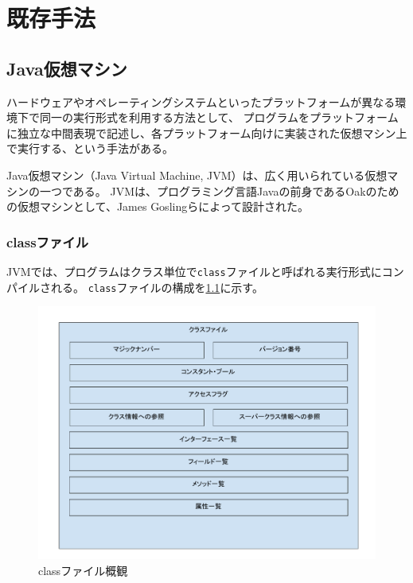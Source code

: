 \chapter{既存手法}
\label{chap:related_works}

\section{Java仮想マシン}

ハードウェアやオペレーティングシステムといったプラットフォームが異なる環境下で同一の実行形式を利用する方法として、
プログラムをプラットフォームに独立な中間表現で記述し、各プラットフォーム向けに実装された仮想マシン上で実行する、という手法がある。

Java仮想マシン（Java Virtual Machine, JVM）\cite{jvms}は、広く用いられている仮想マシンの一つである。
JVMは、プログラミング言語Javaの前身であるOakのための仮想マシンとして、James Goslingらによって設計された。

\subsection{classファイル}

JVMでは、プログラムはクラス単位で\verb|class|ファイルと呼ばれる実行形式にコンパイルされる。
\verb|class|ファイルの構成を\ref{fig:jvm_class_file}に示す。

\begin{figure}[htbp]
  \caption{classファイル概観}
  \label{fig:jvm_class_file}
  \begin{center}
    \includegraphics[bb=0 0 800 600,width=12cm]{img/jvm_class_file.pdf}
  \end{center}
\end{figure}

